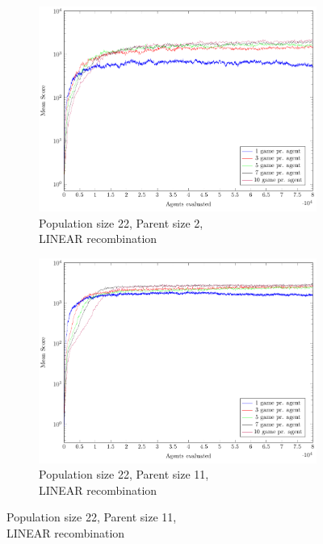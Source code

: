 \begin{figure}
\begin{subfigure}[b]{0.49\textwidth}
    \end{subfigure}
    \begin{subfigure}[b]{0.49\textwidth}
    	\centering
    	\caption{Population size 22, Parent size 2,\\LINEAR recombination}
        \includegraphics[width=\textwidth]{data/cma_population_offspring/22x_split/linear_l22_o2/mean/PlotFile.pdf}
    \end{subfigure}
    \begin{subfigure}[b]{0.49\textwidth}
    	\centering
    	\caption{Population size 22, Parent size 11,\\LINEAR recombination}
        \includegraphics[width=\textwidth]{data/cma_population_offspring/22x_split/linear_l22_o11/mean/PlotFile.pdf}

\end{subfigure}
\end{figure}
